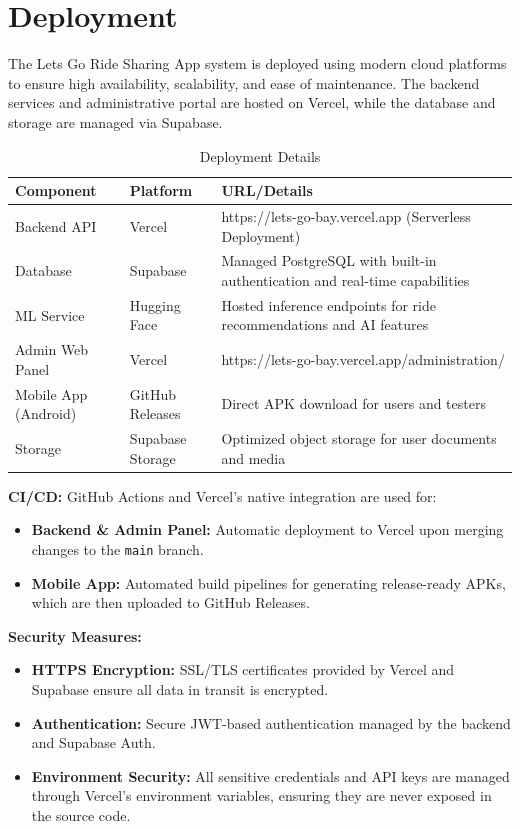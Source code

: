 
\section{Deployment}

The Lets Go Ride Sharing App system is deployed using modern cloud platforms to ensure high availability, scalability, and ease of maintenance. The backend services and administrative portal are hosted on Vercel, while the database and storage are managed via Supabase.

\begin{table}[htbp]
\centering
\caption{Deployment Details}
\begin{tabularx}{\textwidth}{|p{3cm}|p{3cm}|X|}
\hline
\textbf{Component} & \textbf{Platform} & \textbf{URL/Details} \\
\hline
Backend API & Vercel & https://lets-go-bay.vercel.app (Serverless Deployment) \\
\hline
Database & Supabase & Managed PostgreSQL with built-in authentication and real-time capabilities \\
\hline
ML Service & Hugging Face & Hosted inference endpoints for ride recommendations and AI features \\
\hline
Admin Web Panel & Vercel & https://lets-go-bay.vercel.app/administration/ \\
\hline
Mobile App (Android) & GitHub Releases & Direct APK download for users and testers \\
\hline
Storage & Supabase Storage & Optimized object storage for user documents and media \\
\hline
\end{tabularx}
\end{table}

\textbf{CI/CD:} GitHub Actions and Vercel's native integration are used for:
\begin{itemize}
    \item \textbf{Backend \& Admin Panel:} Automatic deployment to Vercel upon merging changes to the \texttt{main} branch.
    \item \textbf{Mobile App:} Automated build pipelines for generating release-ready APKs, which are then uploaded to GitHub Releases.
\end{itemize}

\textbf{Security Measures:}
\begin{itemize}
    \item \textbf{HTTPS Encryption:} SSL/TLS certificates provided by Vercel and Supabase ensure all data in transit is encrypted.
    \item \textbf{Authentication:} Secure JWT-based authentication managed by the backend and Supabase Auth.
    \item \textbf{Environment Security:} All sensitive credentials and API keys are managed through Vercel's environment variables, ensuring they are never exposed in the source code.
\end{itemize}


